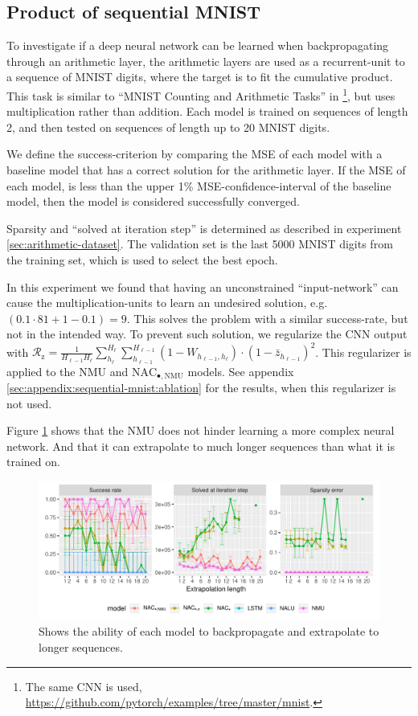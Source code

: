 \subsection{Product of sequential MNIST}
\label{section:results:cumprod_mnist}
To investigate if a deep neural network can be learned when backpropagating through an arithmetic layer, the arithmetic layers are used as a recurrent-unit to a sequence of MNIST digits, where the target is to fit the cumulative product. This task is similar to ``MNIST Counting and Arithmetic Tasks'' in \citet{trask-nalu}\footnote{The same CNN is used, \url{https://github.com/pytorch/examples/tree/master/mnist}.}, but uses multiplication rather than addition. Each model is trained on sequences of length 2, and then tested on sequences of length up to 20 MNIST digits.

We define the success-criterion by comparing the MSE of each model with a baseline model that has a correct solution for the arithmetic layer. If the MSE of each model, is less than the upper 1\% MSE-confidence-interval of the baseline model, then the model is considered successfully converged.

Sparsity and ``solved at iteration step'' is determined as described in experiment \ref{sec:arithmetic-dataset}. The validation set is the last 5000 MNIST digits from the training set, which is used to select the best epoch.

In this experiment we found that having an unconstrained ``input-network'' can cause the multiplication-units to learn an undesired solution, e.g. $(0.1 \cdot 81 + 1 - 0.1) = 9$. This solves the problem with a similar success-rate, but not in the intended way. To prevent such solution, we regularize the CNN output with $\mathcal{R}_{\mathrm{z}} = \frac{1}{H_{\ell-1} H_\ell} \sum_{h_\ell}^{H_\ell} \sum_{h_{\ell-1}}^{H_{\ell-1}} (1 - W_{h_{\ell-1},h_\ell}) \cdot (1 - \bar{z}_{h_{\ell-1}})^2$. This regularizer is applied to the NMU and $\mathrm{NAC}_{\bullet,\mathrm{NMU}}$ models. See appendix \ref{sec:appendix:sequential-mnist:ablation} for the results, when this regularizer is not used.

Figure \ref{fig:sequential-mnist-prod-results} shows that the NMU does not hinder learning a more complex neural network. And that it can extrapolate to much longer sequences than what it is trained on.

\begin{figure}[h]
\centering
\includegraphics[width=\linewidth,trim={0 0.5cm 0 0},clip]{results/sequential_mnist_prod_long.pdf}
\caption{Shows the ability of each model to backpropagate and extrapolate to longer sequences.} 
\label{fig:sequential-mnist-prod-results}
\end{figure}
